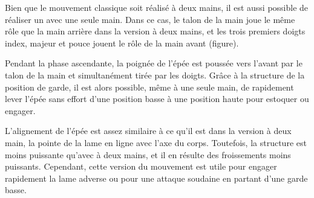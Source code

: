 Bien que le mouvement classique soit réalisé à deux mains, il est aussi possible de réaliser un \Duo{} avec une seule main. Dans ce cas, le talon de la main joue le même rôle que la main arrière dans la version à deux mains, et les trois premiers doigts \textemdash{} index, majeur et pouce \textemdash{} jouent le rôle de la main avant (figure). 

Pendant la phase ascendante, la poignée de l'épée est poussée vers l'avant par le talon de la main et simultanément tirée par les doigts. Grâce à la structure de la position de garde, il est alors possible, même à une seule main, de rapidement lever l'épée sans effort d'une position basse à une position haute pour estoquer ou engager.


L'alignement de l'épée est assez similaire à ce qu'il est dans la version à deux main, la pointe de la lame en ligne avec l'axe du corps. Toutefois, la structure est moins puissante qu'avec \Duo{} à deux mains, et il en résulte des froissements moins puissants. Cependant, cette version du mouvement est utile pour engager rapidement la lame adverse ou pour une attaque soudaine en partant d'une garde basse.